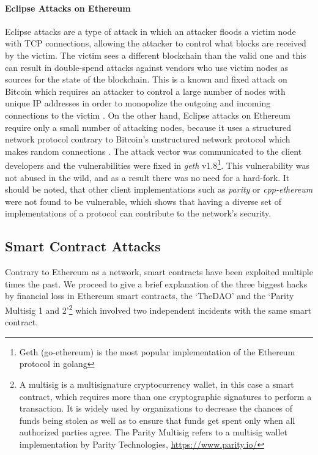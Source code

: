 \paragraph{Eclipse Attacks on Ethereum}
Eclipse attacks are a type of attack in which an attacker floods a victim node with TCP connections, allowing the attacker to control what blocks are received by the victim. The victim sees a different blockchain than the valid one and this can result in double-spend attacks against vendors who use victim nodes as sources for the state of the blockchain. This is a known and fixed attack on Bitcoin which requires an attacker to control a large number of nodes with unique IP addresses in order to monopolize the outgoing and incoming connections to the victim \cite{cryptoeprint:2015:263}. On the other hand, Eclipse attacks on Ethereum require only a small number of attacking nodes, because it uses a structured network protocol contrary to Bitcoin's unstructured network protocol which makes random connections \cite{cryptoeprint:2018:236}. The attack vector was communicated to the client developers and the vulnerabilities were fixed in \textit{geth} v1.8\footnote{Geth (go-ethereum) is the most popular implementation of the Ethereum protocol in golang}. This vulnerability was not abused in the wild, and as a result there was no need for a hard-fork. It should be noted, that other client implementations such as \textit{parity} or \textit{cpp-ethereum} were not found to be vulnerable, which shows that having a diverse set of implementations of a protocol can contribute to the network's security.

\subsection{Smart Contract Attacks}
Contrary to Ethereum as a network, smart contracts have been exploited multiple times the past. We proceed to give a brief explanation of the three biggest hacks by financial loss in Ethereum smart contracts, the `TheDAO' and the `Parity Multisig 1 and 2'\footnote{A multisig is a multisignature cryptocurrency wallet, in this case a smart contract, which requires more than one cryptographic signatures to perform a transaction. It is widely used by organizations to decrease the chances of funds being stolen as well as to ensure that funds get spent only when all authorized parties agree. The Parity Multisig refers to a multisig wallet implementation by Parity Technologies, \url{https://www.parity.io/}} which involved two independent incidents with the same smart contract.

